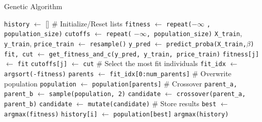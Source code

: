 \begin{algorithm}
\caption{Genetic Algorithm}
\label{GA}
\begin{algorithmic}
\State \texttt{history} $\gets$ []
    \State \# Initialize/Reset lists
    \State \texttt{fitness} $\gets$ \texttt{repeat(}$-\infty$ \texttt{, population\_size)}
    \State \texttt{cutoffs} $\gets$ \texttt{repeat(} $-\infty$\texttt{, population\_size)}
        \State \texttt{X\_train}, \texttt{y\_train}, \texttt{price\_train} $\gets$ \texttt{resample()}
    \EndIf   
        \State \texttt{y\_pred} $\gets$ \texttt{predict\_proba(X\_train,}$\beta$\texttt{)}
        \State \texttt{fit, cut} $\gets$ \texttt{get\_fitness\_and\_c(y\_pred, y\_train, price\_train)}
        \State \texttt{fitness[j]} $\gets$ \texttt{fit}
        \State \texttt{cutoffs[j]} $\gets$ \texttt{cut}
    \EndFor
    \State \# Select the most fit individuals
    \State \texttt{fit\_idx} $\gets$ \texttt{argsort(-fitness)}
    \State \texttt{parents} $\gets$ \texttt{fit\_idx[0:num\_parents]}
    \State \# Overwrite population
    \State \texttt{population} $\gets$ \texttt{population[parents]}
    \State \# Crossover
        \State \texttt{parent\_a, parent\_b} $\gets$ \texttt{sample(population, 2)}
        \State \texttt{candidate} $\gets$ \texttt{crossover(parent\_a, parent\_b)}
            \State \texttt{candidate} $\gets$ \texttt{mutate(candidate)}
        \EndIf
    \EndWhile
    \State \# Store results
    \State \texttt{best} $\gets$ \texttt{argmax(fitness)}
    \State \texttt{history[i]} $\gets$ \texttt{population[best]}
\EndFor
\State \Return \texttt{argmax(history)}
\end{algorithmic}
\end{algorithm}